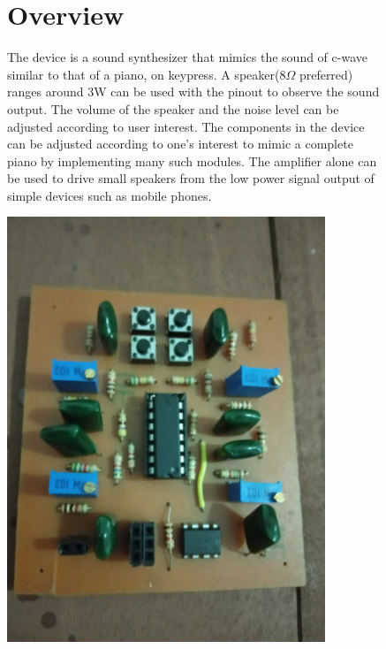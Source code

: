 \documentclass[a4paper,12pt,oneside,pdflatex,italian,final,twocolumn]{article}
\begin{document}
\begin{figure}
    \begin{minipage}{0.65\textwidth}
    \section{Overview}
 The device is a sound synthesizer that mimics the sound of c-wave similar to that of a piano, on keypress.  A speaker(8$\Omega$ preferred) ranges around 3W can be used with the pinout to observe the sound output. The volume of the speaker and the noise level can be adjusted according to user interest. The components in the device can be adjusted according to one's interest to mimic a complete piano by implementing many such modules. The amplifier alone can be used to drive small speakers from the low power signal output of simple devices such as mobile phones. 
    \end{minipage}
    \hfill
    \begin{minipage}{0.3\textwidth}
        \centering
        \includegraphics[width=0.85\textwidth,right]{product.jpg}
    \end{minipage}
\end{figure}
\end{document}
